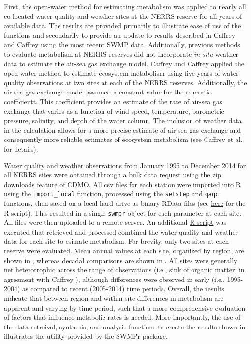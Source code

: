 \documentclass[10pt,letterpaper]{article}\usepackage[]{graphicx}\usepackage[]{color}
\begin{document}
First, the open-water method for estimating metabolism was applied to nearly all co-located water quality and weather sites at the \ac{NERRS} reserve for all years of available data.  The results are provided primarily to illustrate ease of use of the functions and secondarily to provide an update to results described in Caffrey \cite{Caffrey03} and Caffrey \cite{Caffrey04} using the most recent \ac{SWMP} data.  Additionally, previous methods to evaluate metabolism at \ac{NERRS} reserves did not incorporate \textit{in situ} weather data to estimate the air-sea gas exchange model.  Caffrey \cite{Caffrey03} and Caffrey \cite{Caffrey04} applied the open-water method to estimate ecosystem metabolism using five years of water quality observations at two sites at each of the \ac{NERRS} reserves.  Additionally, the air-sea gas exchange model assumed a constant value for the reaeratio coefficientt.  This coefficient provides an estimate of the rate of air-sea gas exchange that varies as a function of wind speed, temperature, barometric pressure, salinity, and depth of the water column.  The inclusion of weather data in the calculation allows for a more precise estimate of air-sea gas exchange and consequently more reliable estimates of ecosystem metabolism (see Caffrey et al. \cite{Caffrey14} for details).

Water quality and weather observations from January 1995 to December 2014 for all \ac{NERRS} sites were obtained through a bulk data request using the \href{http://cdmo.baruch.sc.edu/aqs/zips.cfm}{zip downloads} feature of \ac{CDMO}.  All csv files for each station were imported into R using the \texttt{import\_local} function, processed using the \texttt{setstep} and \texttt{qaqc} functions, then saved on a local hard drive as binary RData files (see \href{https://github.com/fawda123/swmp_rats/blob/master/R/dat_proc.R}{here} for the R script). This resulted in a single \texttt{swmpr} object for each parameter at each site.  All files were then uploaded to a remote server.  An additional \href{https://gist.github.com/fawda123/4fc51c2cb86341ed9291}{R script} was executed that retrieved and processed combined the water quality and weather data for each site to esimate metabolism.  For brevity, only two sites at each reserve were evaluated.  Mean annual values at each site, organized by region, are shown in , whereas decadal comparisons are shown in .  All sites were generally net heterotrophic across the range of observations (i.e., sink of organic matter, in agreement with Caffrey \cite{Caffrey03}), although differences were observed in early (i.e., 1995-2004) as compared to recent (2005-2014) time periods. Overall, the results indicate that between-region and within-site differences in metabolism are apparent and varying by time period, such that a more comprehensive evaluation of factors that influence metabolic rates is needed.  More importantly, the use of the data retreival, synthesis, and analysis functions to create the results shown in  illustrates the utility provided by the SWMPr package.
\end{document}
